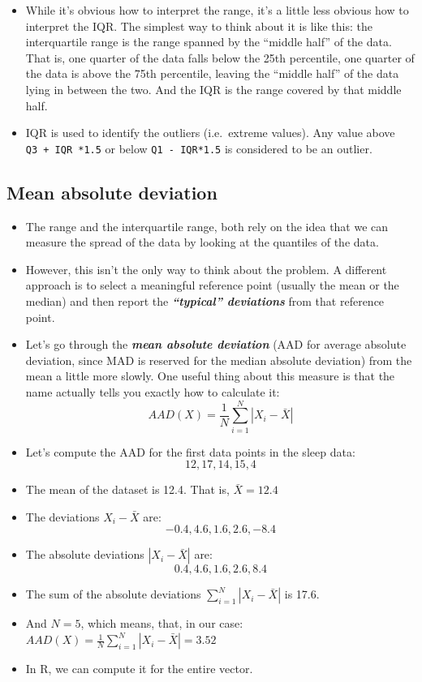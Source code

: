 \documentclass[
]{book}
\begin{document}
\begin{itemize}
\item
  While it's obvious how to interpret the range, it's a little less obvious how to interpret the IQR. The simplest way to think about it is like this: the interquartile range is the range spanned by the ``middle half'' of the data. That is, one quarter of the data falls below the 25th percentile, one quarter of the data is above the 75th percentile, leaving the ``middle half'' of the data lying in between the two. And the IQR is the range covered by that middle half.
\item
  IQR is used to identify the outliers (i.e.~extreme values). Any value above \texttt{Q3\ +\ IQR\ *1.5} or below \texttt{Q1\ -\ IQR*1.5} is considered to be an outlier.
\end{itemize}

\subsection{Mean absolute deviation}\label{aad}

\begin{itemize}
\item
  The range and the interquartile range, both rely on the idea that we can measure the spread of the data by looking at the quantiles of the data.
\item
  However, this isn't the only way to think about the problem. A different approach is to select a meaningful reference point (usually the mean or the median) and then report the \textbf{\emph{``typical'' deviations}} from that reference point.
\item
  Let's go through the \textbf{\emph{mean absolute deviation}} (AAD for average absolute deviation, since MAD is reserved for the median absolute deviation) from the mean a little more slowly. One useful thing about this measure is that the name actually tells you exactly how to calculate it:
  \[
  AAD(X) = \frac{1}{N} \sum_{i = 1}^N |X_i - \bar{X}|
  \]
\item
  Let's compute the AAD for the first data points in the sleep data:
  \[
  12, 17, 14, 15, 4
  \]
\item
  The mean of the dataset is 12.4. That is, \(\bar{X} = 12.4\)
\item
  The deviations \(X_i - \bar{X}\) are:
  \[
  -0.4, 4.6, 1.6, 2.6, -8.4
  \]
\item
  The absolute deviations \(|X_i - \bar{X}|\) are:
  \[
  0.4, 4.6, 1.6, 2.6, 8.4
  \]
\item
  The sum of the absolute deviations \(\sum_{i = 1}^N |X_i - \bar{X}|\) is 17.6.
\item
  And \(N=5\), which means, that, in our case: \(AAD(X) = \frac{1}{N} \sum_{i = 1}^N |X_i - \bar{X}| = 3.52\)
\item
  In R, we can compute it for the entire vector.
\end{itemize}
\end{document}
